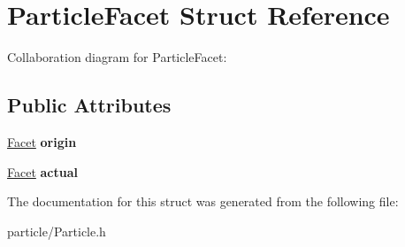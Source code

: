 \hypertarget{struct_particle_facet}{}\section{Particle\+Facet Struct Reference}
\label{struct_particle_facet}


Collaboration diagram for Particle\+Facet\+:
\subsection*{Public Attributes}
\begin{DoxyCompactItemize}
\item 
\mbox{\label{struct_particle_facet_a5aa003b1b0af6628c8553cb30667570f}} 
\mbox{\hyperlink{class_facet}{Facet}} {\bfseries origin}
\item 
\mbox{\label{struct_particle_facet_afffaafe6140078c265ec65c984096b78}} 
\mbox{\hyperlink{class_facet}{Facet}} {\bfseries actual}
\end{DoxyCompactItemize}


The documentation for this struct was generated from the following file\+:\begin{DoxyCompactItemize}
\item 
particle/Particle.\+h\end{DoxyCompactItemize}
